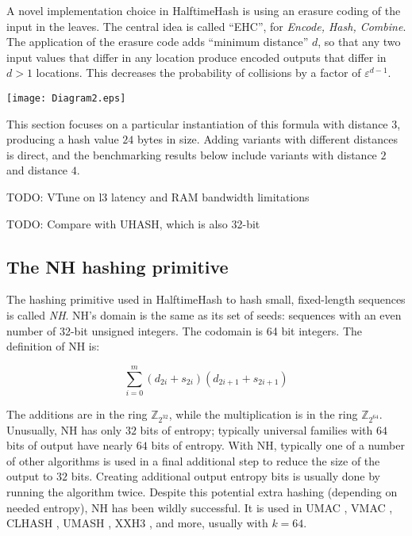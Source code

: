 \documentclass[acmsmall, nonacm]{acmart}
\newcommand{\ints}{\mathbb{Z}}
\begin{document}
A novel implementation choice in HalftimeHash is using an erasure coding of the input in the leaves.
The central idea is called ``EHC'', for {\em Encode, Hash, Combine}. \cite{ehc-nandi}
The application of the erasure code adds ``minimum distance'' $d$, so that any two input values that differ in any location produce encoded outputs that differ in $d > 1$ locations.
This decreases the probability of collisions by a factor of $\varepsilon^{d-1}$.

\texttt{[image: Diagram2.eps]}

This section focuses on a particular instantiation of this formula with distance $3$, producing a hash value $24$ bytes in size.
Adding variants with different distances is direct, and the benchmarking results below include variants with distance $2$ and distance $4$.

TODO: VTune on l3 latency and RAM bandwidth limitations

 TODO: Compare with UHASH, which is also 32-bit

\subsection{The NH hashing primitive}

The hashing primitive used in HalftimeHash to hash small, fixed-length sequences is called {\em NH}. \cite{umac}
NH's domain is the same as its set of seeds: sequences with an even number of 32-bit unsigned integers.
The codomain is 64 bit integers.
The definition of NH is:

$$\sum_{i=0}^m (d_{2i} + s_{2i})(d_{2i+1} + s_{2i+1})$$

The additions are in the ring $\ints_{2^{32}}$, while the multiplication is in the ring $\ints_{2^{64}}$.
Unusually, NH has only $32$ bits of entropy; typically universal families with $64$ bits of output have nearly $64$ bits of entropy. \cite{umash,clhash}
With NH, typically one of a number of other algorithms is used in a final additional step to reduce the size of the output to $32$ bits.
Creating additional output entropy bits is usually done by running the algorithm twice. \cite{umash,umac}
Despite this potential extra hashing (depending on needed entropy), NH has been wildly successful.
It is used in UMAC \cite{umac}, VMAC \cite{vmac}, CLHASH \cite{clhash}, UMASH \cite{umash}, XXH3 \cite{xxh3}, and more, usually with $k = 64$.
\end{document}
